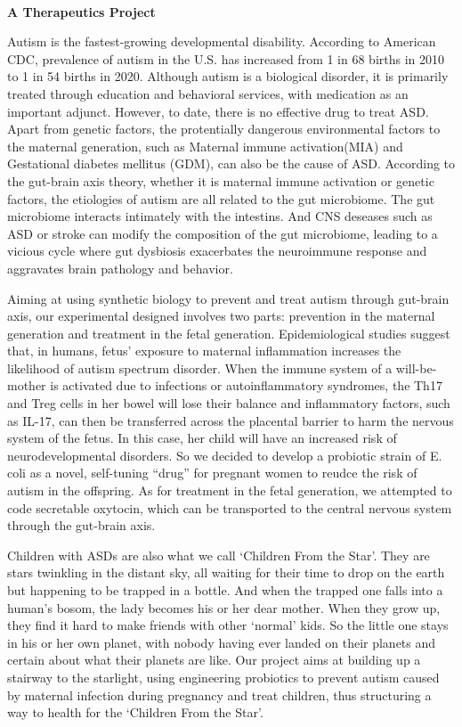 \textbf{\\A Therapeutics Project\\}\begin{spacing}{1.5}

Autism is the fastest-growing developmental disability. According to American CDC, prevalence of autism in the U.S. has increased from 1 in 68 births in 2010 to 1 in 54 births in 2020. Although autism is a biological disorder, it is primarily treated through education and behavioral services, with medication as an important adjunct. However, to date, there is no effective drug to treat ASD. Apart from genetic factors, the protentially dangerous environmental factors to the maternal generation, such as Maternal immune activation(MIA) and Gestational diabetes mellitus (GDM), can also be the cause of ASD. According to the gut-brain axis theory, whether it is maternal immune activation or genetic factors, the etiologies of autism are all related to the gut microbiome. The gut microbiome interacts intimately with the intestins. And CNS deseases such as ASD or stroke can modify the composition of the gut microbiome, leading to a vicious cycle where gut dysbiosis exacerbates the neuroimmune response and aggravates brain pathology and behavior.

Aiming at using synthetic biology to prevent and treat autism through gut-brain axis, our experimental designed involves two parts: prevention in the maternal generation and treatment in the fetal generation. Epidemiological studies suggest that, in humans, fetus’ exposure to maternal inflammation increases the likelihood of autism spectrum disorder. When the immune system of a will-be-mother is activated due to infections or autoinflammatory syndromes, the Th17 and Treg cells in her bowel will lose their balance and inflammatory factors, such as IL-17, can then be transferred across the placental barrier to harm the nervous system of the fetus. In this case, her child will have an increased risk of neurodevelopmental disorders. So we decided to develop a probiotic strain of E. coli as a novel, self-tuning “drug” for pregnant women to reudce the risk of autism in the offspring. As for treatment in the fetal generation, we attempted to code secretable oxytocin, which can be transported to the central nervous system through the gut-brain axis.

Children with ASDs are also what we call ‘Children From the Star’. They are stars twinkling in the distant sky, all waiting for their time to drop on the earth but happening to be trapped in a bottle. And when the trapped one falls into a human’s bosom, the lady becomes his or her dear mother. When they grow up, they find it hard to make friends with other ‘normal’ kids. So the little one stays in his or her own planet, with nobody having ever landed on their planets and certain about what their planets are like. Our project aims at building up a stairway to the starlight, using engineering probiotics to prevent autism caused by maternal infection during pregnancy and treat children, thus structuring a way to health for the ‘Children From the Star’.\end{spacing}
\\

